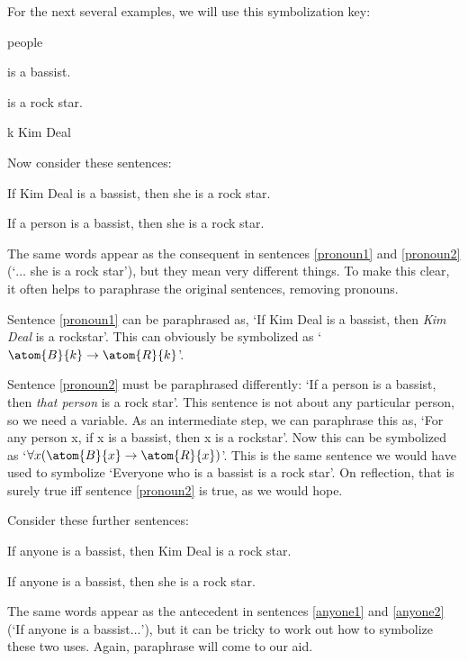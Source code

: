 For the next several examples, we will use this symbolization key:
	\begin{ekey}
		\item[\text{domain}] people
		\item[\atom{B}{x}]  is a bassist.
		\item[\atom{R}{x}]  is a rock star.
		\item[k] Kim Deal
	\end{ekey}
Now consider these sentences:
	\begin{earg}
		\item[\ex{pronoun1}] If Kim Deal is a bassist, then she is a rock star.
		\item[\ex{pronoun2}] If a person is a bassist, then she is a rock star.
	\end{earg}
The same words appear as the consequent in sentences \ref{pronoun1} and \ref{pronoun2} (`$\ldots$ she is a rock star'), but they mean very different things. To make this clear, it often helps to paraphrase the original sentences, removing pronouns.

Sentence \ref{pronoun1} can be paraphrased as, `If Kim Deal is a bassist, then \emph{Kim Deal} is a rockstar'. This can obviously be symbolized as `$\atom{B}{k} \eif \atom{R}{k}$'.

Sentence \ref{pronoun2} must be paraphrased differently: `If a person is a bassist, then \emph{that person} is a rock star'. This sentence is not about any particular person, so we need a variable. As an intermediate step, we can paraphrase this as, `For any person x, if x is a bassist, then x is a rockstar'. Now this can be symbolized as `$\forall x (\atom{B}{x} \eif \atom{R}{x})$'. This is the same sentence we would have used to symbolize `Everyone who is a bassist is a rock star'. On reflection, that is surely true iff sentence \ref{pronoun2} is true, as we would hope.

Consider these further sentences:
	\begin{earg}
		\item[\ex{anyone1}] If anyone is a bassist, then Kim Deal is a rock star.
		\item[\ex{anyone2}] If anyone is a bassist, then she is a rock star.
	\end{earg}
The same words appear as the antecedent in sentences \ref{anyone1} and \ref{anyone2}  (`If anyone is a bassist$\ldots$'), but it can be tricky to work out how to symbolize these two uses. Again, paraphrase will come to our aid.

